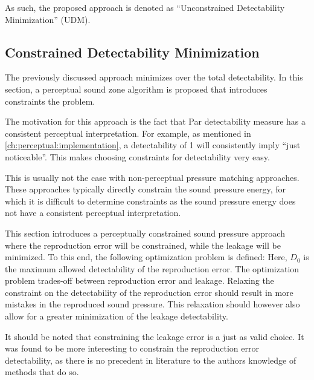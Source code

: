As such, the proposed approach is denoted as ``Unconstrained Detectability Minimization'' (UDM).

\subsection{Constrained Detectability Minimization}
The previously discussed approach minimizes over the total detectability.
In this section, a perceptual sound zone algorithm is proposed that introduces constraints the problem. 

The motivation for this approach is the fact that Par detectability measure has a consistent perceptual interpretation.
For example, as mentioned in \autoref{ch:perceptual:implementation}, a detectability of 1 will consistently imply ``just noticeable''.
This makes choosing constraints for detectability very easy.

This is usually not the case with non-perceptual pressure matching approaches.
These approaches typically directly constrain the sound pressure energy,
for which it is difficult to determine constraints as the sound pressure energy does not have a consistent perceptual interpretation.

This section introduces a perceptually constrained sound pressure approach where the reproduction error will be constrained,
while the leakage will be minimized.
To this end, the following optimization problem is defined:
Here, $D_0$ is the maximum allowed detectability of the reproduction error.
The optimization problem trades-off between reproduction error and leakage. 
Relaxing the constraint on the detectability of the reproduction error should result in more mistakes in the reproduced sound pressure.
This relaxation should however also allow for a greater minimization of the leakage detectability.

It should be noted that constraining the leakage error is a just as valid choice.
It was found to be more interesting to constrain the reproduction error detectability, as there is no precedent in literature to the authors knowledge of methods 
that do so.
